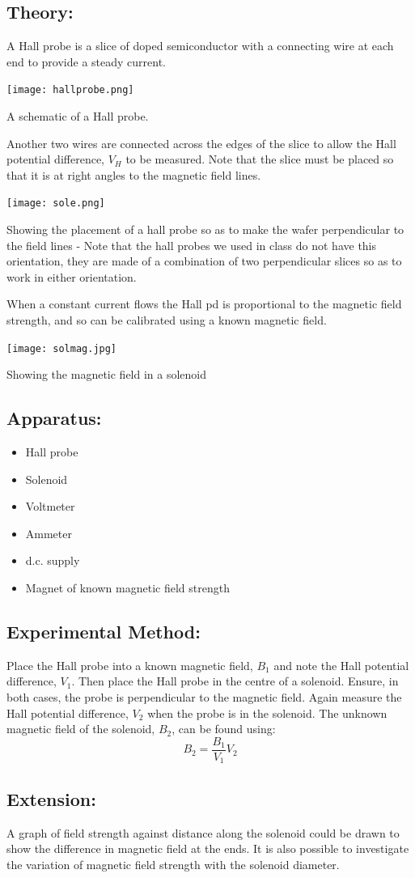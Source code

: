 \subsection{Theory:}
A Hall probe is a slice of doped  semiconductor with a connecting wire at each end to provide a steady current.\begin{marginfigure}
	\texttt{[image: hallprobe.png]}
	\caption{A schematic of a Hall probe.}
\end{marginfigure} Another two wires are connected across the edges of the slice to allow the Hall potential difference, \(V_H\) to be measured. Note that the slice must be placed so that it is at right angles to the magnetic field lines.\begin{marginfigure}
\texttt{[image: sole.png]}
\caption {Showing the placement of a hall probe so as to make the wafer perpendicular to the field lines - Note that the hall probes we used in class do not have this orientation, they are made of a combination of two perpendicular slices so as to work in either orientation.}
\end{marginfigure} When a constant current flows the Hall pd is proportional to the magnetic field strength, and so can be calibrated using a known magnetic field.
\begin{marginfigure}
	\texttt{[image: solmag.jpg]}
	\caption{Showing the magnetic field in a solenoid}
\end{marginfigure}
\subsection{Apparatus:}
\begin{itemize}
	\item Hall probe
\item Solenoid
\item Voltmeter
\item Ammeter
\item d.c. supply
\item Magnet of known magnetic field strength
\end{itemize}
\subsection{Experimental Method:}
Place the Hall probe into a known magnetic field, \(B_{1}\) and note the Hall potential difference, \(V_{1}\). Then place the Hall probe in the centre of a solenoid. Ensure, in both cases, the probe is perpendicular to the magnetic field. Again measure the Hall potential difference, \(V_2\) when the probe is in the solenoid. The unknown magnetic field of the solenoid, \(B_2\), can be found using:
\[B_{2} = \frac{B_{1}}{V_{1}}V_{2} \]
\subsection{Extension:}
A graph of field strength against distance along the solenoid could be drawn to show the difference in magnetic field at the ends. It is also possible to investigate the variation of magnetic field strength with the solenoid diameter.